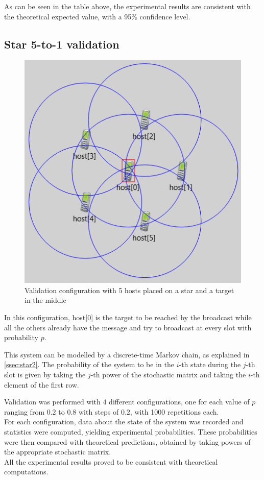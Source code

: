 As can be seen in the table above, %
the experimental results are consistent with the theoretical expected value, with a 95\% confidence level. %
\subsection{Star 5-to-1 validation}

\begin{figure}
\includegraphics[width=1\linewidth]{img/omnetStar5to1.png} 
\caption{Validation configuration with 5 hosts placed on a star and a target in the middle}
\label{fig:star5to1GUI}
\end{figure}

In this configuration, host[0] is the target to be reached by the broadcast while all the others already have the message and try to broadcast at every slot with probability $p$.

This system can be modelled by a discrete-time Markov chain, as explained in \ref{ssec:star2}.
The probability of the system to be in the $i$-th state during the $j$-th slot is given by taking the $j$-th power of the stochastic matrix and taking the $i$-th element of the first row.

Validation was performed with 4 different configurations, one for each value of $p$ ranging from $0.2$ to $0.8$ with steps of $0.2$, with 1000 repetitions each.\\
For each configuration, data about the state of the system was recorded and statistics were computed, yielding experimental probabilities. These probabilities were then compared with theoretical predictions, obtained by taking powers of the appropriate stochastic matrix.\\
All the experimental results proved to be consistent with theoretical computations.

